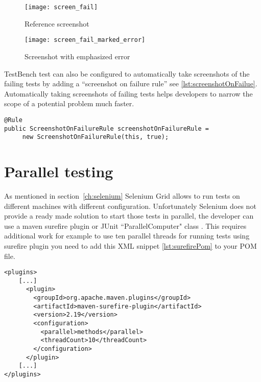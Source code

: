	\begin{figure}
	\centering
	\texttt{[image: screen\_fail]}
	\caption{Reference screenshot}
	\label{fig:failedscreen}
	\end{figure}

	\begin{figure}
	\centering
	\texttt{[image: screen\_fail\_marked\_error]}
	\caption{Screenshot with emphasized error}
	\label{fig:failedscreenmarked}
	\end{figure}

TestBench test can also be configured to automatically take screenshots of the failing tests by adding
a ``screenshot on failure rule'' see \ref{lst:screenshotOnFailue}. Automatically
taking screenshots of failing tests helps developers to narrow the
scope of a potential problem much faster.

\lstset{style=a1listing}
  	\begin{lstlisting}[caption=Adding screenshot on failure	rule,label={lst:screenshotOnFailue}]
@Rule
public ScreenshotOnFailureRule screenshotOnFailureRule =
	 new ScreenshotOnFailureRule(this, true);
	\end{lstlisting}

\section{Parallel testing}
\label{sec:paralelTesting}
As mentioned in section~\ref{ch:selenium} Selenium Grid allows to run
tests on different machines with different configuration. Unfortunately
Selenium does not provide a ready made solution to start those tests in
parallel, the developer can  use a maven surefire plugin \cite{sureFireExample} 
or JUnit ``ParallelComputer" class \cite{junitParallelComputer}. This requires
additional work for example to use ten parallel threads for running tests using
surefire plugin you need to add this XML snippet \ref{lst:surefirePom}
to your POM file.

\lstset{style=console}
\begin{lstlisting}[caption=Get Vaadin Table cell Value,label={lst:surefirePom}]
<plugins>
    [...]
      <plugin>
        <groupId>org.apache.maven.plugins</groupId>
        <artifactId>maven-surefire-plugin</artifactId>
        <version>2.19</version>
        <configuration>
          <parallel>methods</parallel>
          <threadCount>10</threadCount>
        </configuration>
      </plugin>
    [...]
</plugins>
\end{lstlisting}	

